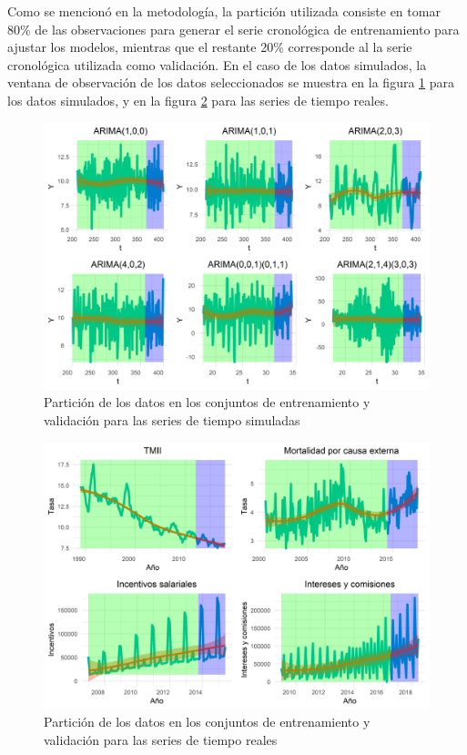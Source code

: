 \documentclass[
]{article}
\begin{document}
Como se mencionó en la metodología, la partición utilizada consiste en
tomar 80\% de las observaciones para generar el serie cronológica de
entrenamiento para ajustar los modelos, mientras que el restante 20\%
corresponde al la serie cronológica utilizada como validación. En el
caso de los datos simulados, la ventana de observación de los datos
seleccionados se muestra en la figura
\ref{fig:particion_series_simuladas} para los datos simulados, y en la
figura \ref{fig:particion_series_reales} para las series de tiempo
reales.

\begin{figure}[H]
\includegraphics[width=1\linewidth,height=1\textheight]{Tesis_files/figure-latex/particion_series_simuladas-1} \caption{Partición de los datos en los conjuntos de entrenamiento y validación para las series de tiempo simuladas}\label{fig:particion_series_simuladas}
\end{figure}

\begin{figure}[H]
\includegraphics[width=1\linewidth,height=1\textheight]{Tesis_files/figure-latex/particion_series_reales-1} \caption{Partición de los datos en los conjuntos de entrenamiento y validación para las series de tiempo reales}\label{fig:particion_series_reales}
\end{figure}
\end{document}
